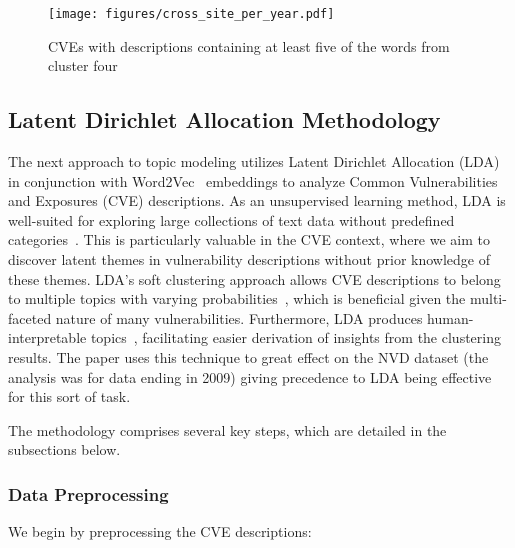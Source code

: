 \begin{figure}[t]
	\begin{center}

		\texttt{[image: figures/cross\_site\_per\_year.pdf]}
	\end{center}

	\caption{\label{fig:cross_site_per_year}CVEs with descriptions containing at least five of the words from cluster four}
\end{figure}


\subsection{Latent Dirichlet Allocation Methodology}

The next approach to topic modeling utilizes Latent Dirichlet Allocation (LDA)~\cite{lda_origin} in conjunction with Word2Vec~\cite{word2vec} embeddings to analyze Common Vulnerabilities and Exposures (CVE) descriptions. As an unsupervised learning method, LDA is well-suited for exploring large collections of text data without predefined categories~\cite{lda_origin, latent_handbook}. This is particularly valuable in the CVE context, where we aim to discover latent themes in vulnerability descriptions without prior knowledge of these themes. LDA's soft clustering approach allows CVE descriptions to belong to multiple topics with varying probabilities~\cite{latent_handbook}, which is beneficial given the multi-faceted nature of many vulnerabilities. Furthermore, LDA produces human-interpretable topics~\cite{lda_origin}, facilitating easier derivation of insights from the clustering results. The paper \cite{cve_topic_modelling} uses this technique to great effect on the NVD dataset (the analysis was for data ending in 2009) giving precedence to LDA being effective for this sort of task.

The methodology comprises several key steps, which are detailed in the subsections below.

\subsubsection{Data Preprocessing}

We begin by preprocessing the CVE descriptions:

